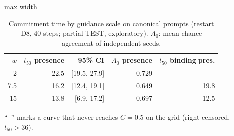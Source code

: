 \begin{table}[t]\centering\small
\caption{Commitment time by guidance scale on canonical prompts (restart D8, 40 steps; partial TEST, exploratory). $\bar A_0$: mean chance agreement of independent seeds.}\label{tab:partial-t50-w}
\begin{adjustbox}{max width=\linewidth}\begin{tabular}{rrrrr}
\toprule
$w$ & $t_{50}$ presence & 95\% CI & $\bar A_0$ presence & $t_{50}$ binding$\mid$pres. \\
\midrule
2 & 22.5 & [19.5, 27.9] & 0.729 & -- \\
7.5 & 16.2 & [12.4, 19.1] & 0.649 & 19.8 \\
15 & 13.8 & [6.9, 17.2] & 0.697 & 12.5 \\
\bottomrule
\end{tabular}\end{adjustbox}
\par\smallskip\footnotesize ``--'' marks a curve that never reaches $C = 0.5$ on the grid (right-censored, $t_{50} > 36$).
\end{table}
